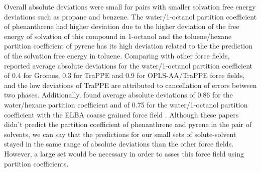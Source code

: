 Overall absolute deviations were small for pairs with smaller solvation free energy deviations such as propane and benzene. The water/1-octanol partition coefficient of phenanthrene had higher deviation due to the higher deviation of the free energy of solvation of this compound in 1-octanol and the toluene/hexane partition coefficient of pyrene has its high deviation related to the the prediction of the solvation free energy in toluene. Comparing with other force fields,  reported average absolute deviations for the water/1-octanol partition coefficient of 0.4 for Gromos, 0.3 for TraPPE and 0.9 for OPLS-AA/TraPPE force fields, and the low deviations of TraPPE are attributed to cancellation of errors between two phases. Additionally,  found average absolute deviations of 0.86 for the water/hexane partition coefficient and of 0.75 for the water/1-octanol partition coefficient with the ELBA coarse grained force field . Although these papers didn't predict the partition coefficient of phenanthrene and pyrene  in the pair of solvents, we can say that the predictions for our small sets of solute-solvent stayed in the same range of absolute deviations than the other force fields. However, a large set would be necessary in order to asses this force field using partition coefficients. 
